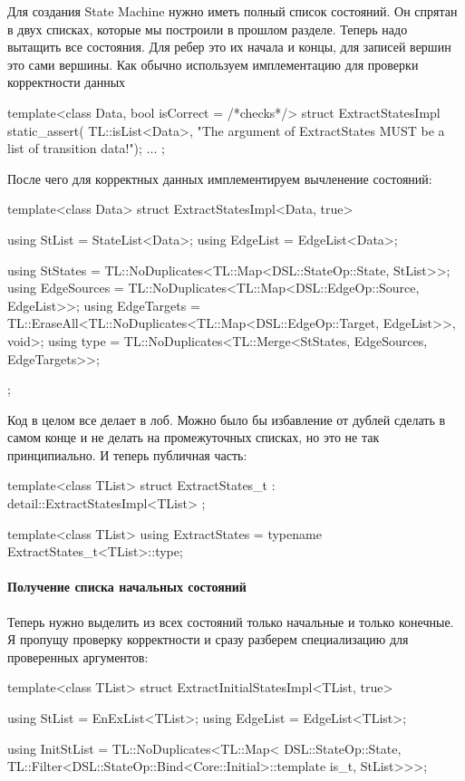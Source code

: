 \documentclass{article}
\begin{document}
{Для создания State Machine нужно иметь полный список состояний.
Он спрятан в двух списках, которые мы построили в прошлом разделе.
Теперь надо вытащить все состояния.
Для ребер это их начала и концы, для записей вершин это сами вершины.
Как обычно используем имплементацию для проверки корректности данных
\begin{cppcode}
template<class Data, bool isCorrect = /*checks*/>
struct ExtractStatesImpl {
  static_assert(
      TL::isList<Data>, "The argument of ExtractStates MUST be a list of transition data!");
  ...
};
\end{cppcode}
После чего для корректных данных имплементируем вычленение состояний:
\begin{cppcode}
template<class Data>
struct ExtractStatesImpl<Data, true> {
  using StList = StateList<Data>;
  using EdgeList = EdgeList<Data>;
  
  using StStates = TL::NoDuplicates<TL::Map<DSL::StateOp::State, StList>>;
  using EdgeSources = TL::NoDuplicates<TL::Map<DSL::EdgeOp::Source, EdgeList>>;
  using EdgeTargets =
      TL::EraseAll<TL::NoDuplicates<TL::Map<DSL::EdgeOp::Target, EdgeList>>,
                   void>;
  using type = TL::NoDuplicates<TL::Merge<StStates, EdgeSources, EdgeTargets>>;
};
\end{cppcode}
Код в целом все делает в лоб.
Можно было бы избавление от дублей сделать в самом конце и не делать на промежуточных списках, но это не так принципиально.
И теперь публичная часть:
\begin{cppcode}
template<class TList>
struct ExtractStates_t : detail::ExtractStatesImpl<TList> {};

template<class TList>
using ExtractStates = typename ExtractStates_t<TList>::type;
\end{cppcode}


\paragraph{Получение списка начальных состояний}

Теперь нужно выделить из всех состояний только начальные и только конечные.
Я пропущу проверку корректности и сразу разберем специализацию для проверенных аргументов:
\begin{cppcode}
template<class TList>
struct ExtractInitialStatesImpl<TList, true> {
  using StList = EnExList<TList>;
  using EdgeList = EdgeList<TList>;

  using InitStList = TL::NoDuplicates<TL::Map<
      DSL::StateOp::State,
      TL::Filter<DSL::StateOp::Bind<Core::Initial>::template is_t, StList>>>;

}
\end{cppcode}}
\end{document}
